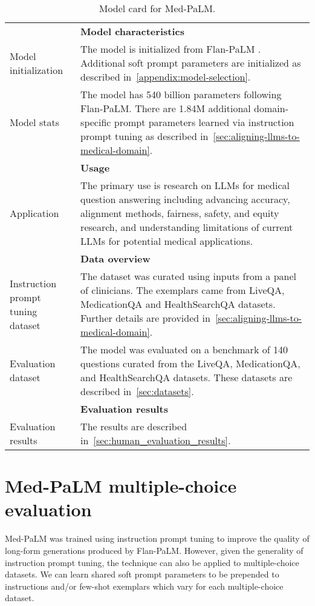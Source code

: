 \begin{table}[]
\centering
\small
\caption{Model card for Med-PaLM.}
\vspace{3pt}
\label{tab:model-card-med-palm}
\begin{tabular}{lp{}}
\toprule
\textbf{}            & \textbf{Model characteristics}                               \\ 
Model initialization & The model is initialized from Flan-PaLM \cite{chung2022scaling}. Additional soft prompt parameters are initialized as described in~\cref{appendix:model-selection}. \\
Model stats &
  The  model has 540 billion parameters following Flan-PaLM. There are 1.84M additional domain-specific prompt parameters learned via instruction prompt tuning as described in~\cref{sec:aligning-llms-to-medical-domain}. \\ \hline
                     & \textbf{Usage}                                               \\
Application &
  The primary use is research on LLMs for medical question answering including advancing accuracy, alignment methods, fairness, safety, and equity research, and understanding limitations of current LLMs for potential medical applications. \\ \hline
                     & \textbf{Data overview}                                       \\
Instruction prompt tuning dataset &
  The dataset was curated using inputs from a panel of clinicians. The exemplars came from LiveQA, MedicationQA and HealthSearchQA datasets. Further details are provided in~\cref{sec:aligning-llms-to-medical-domain}. \\
Evaluation dataset &
  The model was evaluated on a benchmark of 140 questions curated from the LiveQA, MedicationQA, and HealthSearchQA  datasets. These datasets are described in~\cref{sec:datasets}. \\
                     & \textbf{Evaluation results}                                  \\
Evaluation results   & The results are described in~\cref{sec:human_evaluation_results}.          \\
\bottomrule
\end{tabular}
\end{table}

\section{Med-PaLM multiple-choice evaluation}
\label{sec:med-palm-mcq-eval}
Med-PaLM was trained using instruction prompt tuning to improve the quality of long-form generations produced by Flan-PaLM. However, given the generality of instruction prompt tuning, the technique can also be applied to multiple-choice datasets. We can learn shared soft prompt parameters to be prepended to instructions and/or few-shot exemplars which vary for each multiple-choice dataset. 

